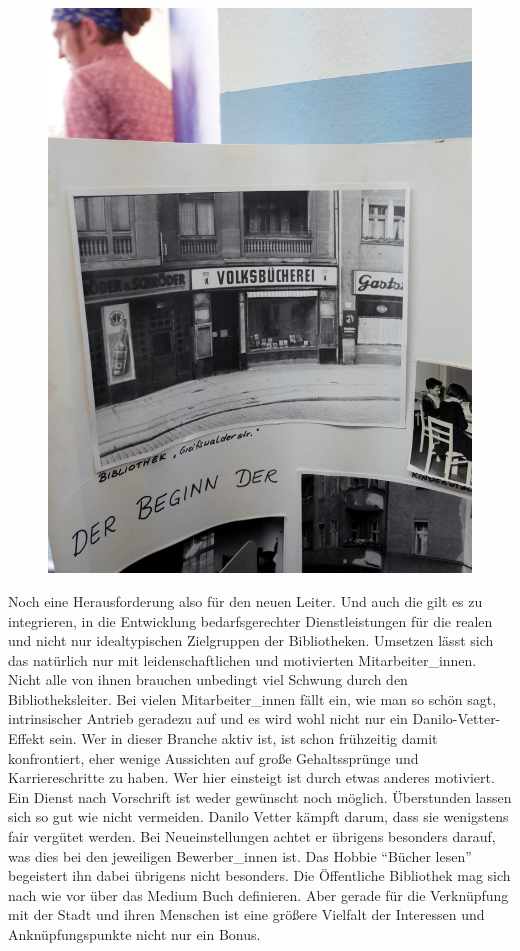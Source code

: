 \documentclass[a4paper,
fontsize=11pt,
oneside,
numbers=noperiodatend,
parskip=half-,
bibliography=totoc,
final
]{scrartcl}
\begin{document}
\begin{figure}
\centering
\includegraphics{img/pankow-volksbuecherei.jpg}
\end{figure}

Noch eine Herausforderung also für den neuen Leiter. Und auch die gilt
es zu integrieren, in die Entwicklung bedarfsgerechter Dienstleistungen
für die realen und nicht nur idealtypischen Zielgruppen der
Bibliotheken. Umsetzen lässt sich das natürlich nur mit
leidenschaftlichen und motivierten Mitarbeiter\_innen. Nicht alle von
ihnen brauchen unbedingt viel Schwung durch den Bibliotheksleiter. Bei
vielen Mitarbeiter\_innen fällt ein, wie man so schön sagt,
intrinsischer Antrieb geradezu auf und es wird wohl nicht nur ein
Danilo-Vetter-Effekt sein. Wer in dieser Branche aktiv ist, ist schon
frühzeitig damit konfrontiert, eher wenige Aussichten auf große
Gehaltssprünge und Karriereschritte zu haben. Wer hier einsteigt ist
durch etwas anderes motiviert. Ein Dienst nach Vorschrift ist weder
gewünscht noch möglich. Überstunden lassen sich so gut wie nicht
vermeiden. Danilo Vetter kämpft darum, dass sie wenigstens fair vergütet
werden. Bei Neueinstellungen achtet er übrigens besonders darauf, was
dies bei den jeweiligen Bewerber\_innen ist. Das Hobbie \enquote{Bücher
lesen} begeistert ihn dabei übrigens nicht besonders. Die Öffentliche
Bibliothek mag sich nach wie vor über das Medium Buch definieren. Aber
gerade für die Verknüpfung mit der Stadt und ihren Menschen ist eine
größere Vielfalt der Interessen und Anknüpfungspunkte nicht nur ein
Bonus.
\end{document}
